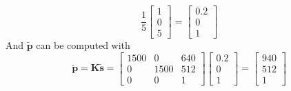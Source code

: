 \documentclass[12pt, letterpaper]{article}
\begin{document}
\begin{enumerate}
\begin{equation*}
                \frac{1}{5}                
                \begin{bmatrix}
                    1\\
                    0\\
                    5
                \end{bmatrix}=
                \begin{bmatrix}
                    0.2\\
                    0\\
                    1
                \end{bmatrix}
            \end{equation*}
            And $\bm{\tilde{p}}$ can be computed with
            \begin{equation*}
                \bm{\tilde{p}}=\bm{K\tilde{s}}=
                \begin{bmatrix}
                    1500 & 0 & 640\\
                    0 & 1500 & 512\\
                    0 & 0 & 1
                \end{bmatrix}
                \begin{bmatrix}
                    0.2\\
                    0\\
                    1
                \end{bmatrix}=
                \begin{bmatrix}
                    940\\
                    512\\
                    1
                \end{bmatrix}
            \end{equation*}
\end{enumerate}
\end{document}
